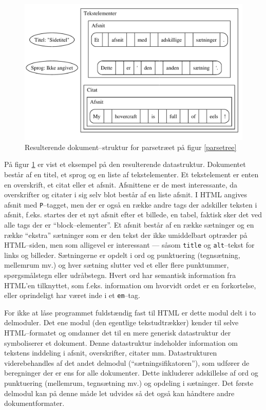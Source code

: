 \documentclass[a4paper,oneside]{memoir}
\begin{document}
\begin{figure}
  \includegraphics[width=\textwidth]{documentill.pdf}
  \caption{Resulterende dokument--struktur for parsetræet på figur
    \ref{parsetree}}
  \label{dokument}
\end{figure}

På figur \ref{dokument} er vist et eksempel på den resulterende
datastruktur. Dokumentet består af en titel, et sprog og en liste af
tekstelementer. Et tekstelement er enten en overskrift, et citat eller
et afsnit. Afsnittene er de mest interessante, da overskrifter og
citater i sig selv blot består af en liste afsnit. I HTML angives
afsnit med \texttt{P}--tagget, men der er også en række andre tags der
adskiller teksten i afsnit, f.eks. startes der et nyt afsnit efter et
billede, en tabel, faktisk sker det ved alle tags der er
``block--elementer''. Et afsnit består af en række sætninger og en
række ``ekstra'' sætninger som er den tekst der ikke umiddelbart
optræder på HTML--siden, men som alligevel er interessant --- såsom
\texttt{title} og \texttt{alt}--tekst for links og
billeder. Sætningerne er opdelt i ord og punktuering (tegnsætning,
mellemrum mv.) og hver sætning slutter ved et eller flere punktummer,
spørgsmålstegn eller udråbstegn. Hvert ord har semantisk
information fra HTML'en tilknyttet, som f.eks. information om hvorvidt
ordet er en forkortelse, eller oprindeligt har været inde i et
\texttt{em}--tag.

For ikke at låse programmet fuldstændig fast til HTML er dette modul
delt i to delmoduler. Det ene modul (den egentlige tekstudtrækker)
kender til selve HTML--formatet og omdanner det til en mere generisk
datastruktur der symboliserer et dokument. Denne datastruktur
indeholder information om tekstens inddeling i afsnit, overskrifter,
citater mm. Datastrukturen viderebehandles af det andet delmodul
(``sætningsifikatoren''), som udfører de
beregninger der er ens for
alle dokumenter. Dette inkluderer adskillelse af ord og punktuering
(mellemrum, tegnsætning mv.) og opdeling i sætninger.  Det første
delmodul kan på denne måde let udvides så det også kan håndtere andre
dokumentformater.
\end{document}
